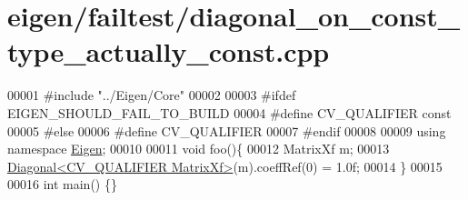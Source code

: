 \hypertarget{eigen_2failtest_2diagonal__on__const__type__actually__const_8cpp_source}{}\section{eigen/failtest/diagonal\+\_\+on\+\_\+const\+\_\+type\+\_\+actually\+\_\+const.cpp}
\label{eigen_2failtest_2diagonal__on__const__type__actually__const_8cpp_source}

\begin{DoxyCode}
00001 \textcolor{preprocessor}{#include "../Eigen/Core"}
00002 
00003 \textcolor{preprocessor}{#ifdef EIGEN\_SHOULD\_FAIL\_TO\_BUILD}
00004 \textcolor{preprocessor}{#define CV\_QUALIFIER const}
00005 \textcolor{preprocessor}{#else}
00006 \textcolor{preprocessor}{#define CV\_QUALIFIER}
00007 \textcolor{preprocessor}{#endif}
00008 
00009 \textcolor{keyword}{using namespace }\hyperlink{namespace_eigen}{Eigen};
00010 
00011 \textcolor{keywordtype}{void} foo()\{
00012     MatrixXf m;
00013     \hyperlink{group___core___module_class_eigen_1_1_diagonal}{Diagonal<CV\_QUALIFIER MatrixXf>}(m).coeffRef(0) = 1.0f;
00014 \}
00015 
00016 \textcolor{keywordtype}{int} main() \{\}
\end{DoxyCode}

